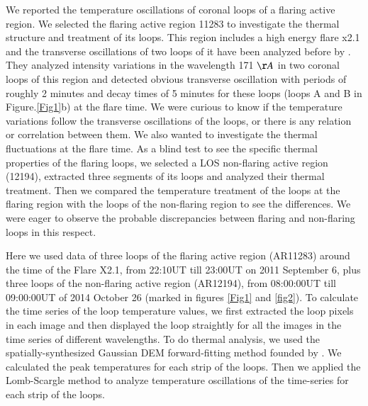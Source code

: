 \documentclass[oneside,onecolumn]{article}
\begin{document}
We reported the temperature oscillations of coronal loops of a flaring active region. We selected the flaring active region 11283 to investigate the thermal structure and treatment of its loops. This region includes a high energy flare x2.1 and the transverse oscillations of two loops of it have been analyzed before by \citet{ref:Jain2015}. They analyzed intensity variations in the wavelength 171 $\AA$ in two coronal loops of this region and detected obvious transverse oscillation with periods of roughly 2 minutes and decay times of 5 minutes for these loops (loops A and B in Figure.\ref{Fig1}b) at the flare time. We were curious to know if the temperature variations follow the transverse oscillations of the loops, or there is any relation or correlation between them. We also wanted to investigate the thermal fluctuations at the flare time. As a blind test to see the specific thermal properties of the flaring loops, we selected a LOS non-flaring active region (12194), extracted three segments of its loops and analyzed their thermal treatment. Then we compared the temperature treatment of the loops at the flaring region with the loops of the non-flaring region to see the differences. We were eager to observe the probable discrepancies between flaring and non-flaring loops in this respect.

Here we used data of three loops of the flaring active region (AR11283) around the time of the Flare X2.1, from 22:10UT till 23:00UT on 2011 September 6, plus three loops of the non-flaring active region (AR12194), from 08:00:00UT till 09:00:00UT of 2014 October 26 (marked in figures \ref{Fig1} and \ref{fig2}). To calculate the time series of the loop temperature values, we first extracted the loop pixels in each image and then displayed the loop straightly for all the images in the time series of different wavelengths. To do thermal analysis, we used the spatially-synthesized Gaussian DEM forward-fitting method founded by \citet{ref:Aschwanden2015}. We calculated the peak temperatures for each strip of the loops. Then we applied the Lomb-Scargle method to analyze temperature oscillations of the time-series for each strip of the loops. 
\end{document}
